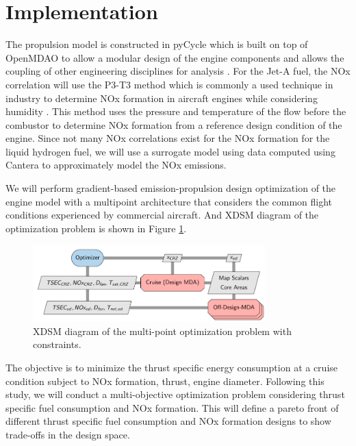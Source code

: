 \documentclass[conf]{new-aiaa}
\begin{document}
\section{Implementation}
\label{sec:imp}
The propulsion model is constructed in pyCycle which is built on top of OpenMDAO to allow a modular design of the engine components and allows the coupling of other engineering disciplines for analysis \cite{Gray2019a}.
For the Jet-A fuel, the NOx correlation will use the P3-T3 method which is commonly a used technique in industry to determine NOx formation in aircraft engines while considering humidity \cite[]{Dubois2006}.
This method uses the pressure and temperature of the flow before the combustor to determine NOx formation from a reference design condition of the engine.
Since not many NOx correlations exist for the NOx formation for the liquid hydrogen fuel, we will use a surrogate model using data computed using Cantera to approximately model the NOx emissions.

We will perform gradient-based emission-propulsion design optimization of the engine model with a multipoint architecture that considers the common flight conditions experienced by commercial aircraft. And XDSM diagram of the optimization problem is shown in Figure \ref{fig:opt_prob}.

\begin{figure}[H]
	\centering
	\includegraphics[width=0.8\textwidth]{N3_inject.pdf}
	\caption{XDSM diagram of the multi-point optimization problem with constraints.}
	\label{fig:opt_prob}
\end{figure}

The objective is to minimize the thrust specific energy consumption at a cruise condition subject to NOx formation, thrust, engine diameter.
Following this study, we will conduct a multi-objective optimization problem considering thrust specific fuel consumption and NOx formation.
This will define a pareto front of different thrust specific fuel consumption and NOx formation designs to show trade-offs in the design space.
\end{document}
